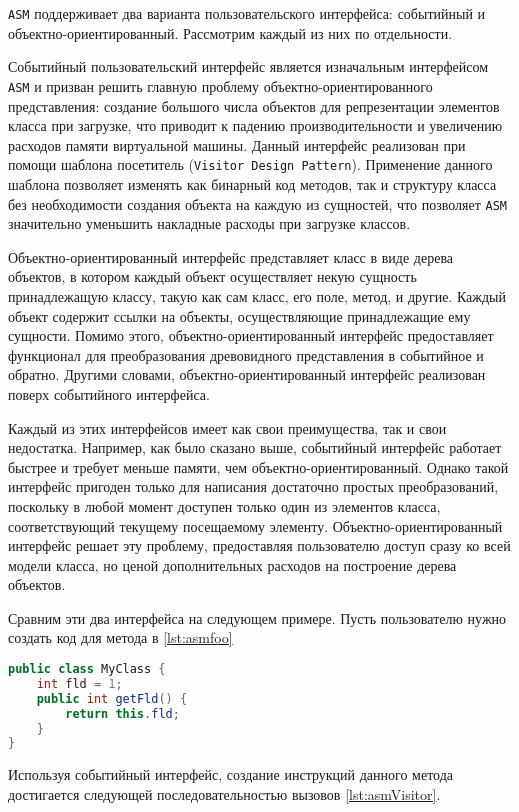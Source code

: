 \texttt{ASM} поддерживает два варианта пользовательского интерфейса: событийный и объектно-ориентированный. Рассмотрим каждый из них по отдельности.

Событийный пользовательский интерфейс является изначальным интерфейсом \texttt{ASM} и призван решить главную проблему объектно-ориентированного представления: создание большого числа объектов для репрезентации элементов класса при загрузке, что приводит к падению производительности и увеличению расходов памяти виртуальной машины. Данный интерфейс реализован при помощи шаблона посетитель (\texttt{Visitor~Design~Pattern}). Применение данного шаблона позволяет изменять как бинарный код методов, так и структуру класса без необходимости создания объекта на каждую из сущностей, что позволяет \texttt{ASM} значительно уменьшить накладные расходы при загрузке классов.

Объектно-ориентированный интерфейс представляет класс в виде дерева объектов, в котором каждый объект осуществляет некую сущность принадлежащую классу, такую как сам класс, его поле, метод, и другие. Каждый объект содержит ссылки на объекты, осуществляющие принадлежащие ему сущности. Помимо этого, объектно-ориентированный интерфейс предоставляет функционал для преобразования древовидного представления в событийное и обратно. Другими словами, объектно-ориентированный интерфейс реализован поверх событийного интерфейса.

Каждый из этих интерфейсов имеет как свои преимущества, так и свои недостатка. Например, как было сказано выше, событийный интерфейс работает быстрее и требует меньше памяти, чем объектно-ориентированный. Однако такой интерфейс пригоден только для написания достаточно простых преобразований, поскольку в любой момент доступен только один из элементов класса, соответствующий текущему посещаемому элементу. Объектно-ориентированный интерфейс решает эту проблему, предоставляя пользователю доступ сразу ко всей модели класса, но ценой дополнительных расходов на построение дерева объектов.

Сравним эти два интерфейса на следующем примере. Пусть пользователю нужно создать код для метода в \autoref{lst:asmfoo}

\begin{lstlisting}[language=Java, caption=Необходимый метод., label=lst:asmfoo]
public class MyClass {
    int fld = 1;
    public int getFld() {
        return this.fld;
    }
}
\end{lstlisting}

Используя событийный интерфейс, создание инструкций данного метода достигается следующей последовательностью вызовов \autoref{lst:asmVisitor}.

